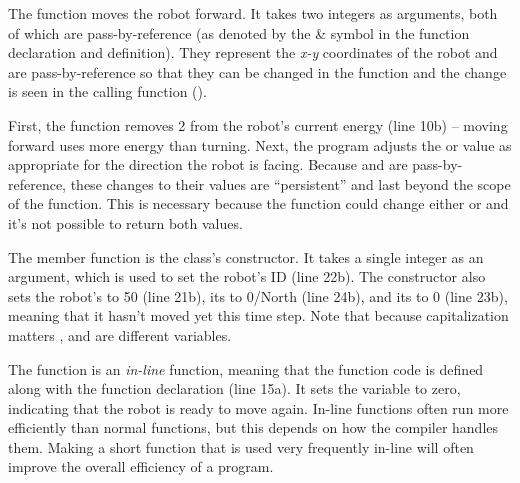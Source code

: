 
The  function moves the robot forward.  It takes two integers as arguments, both of which are pass-by-reference (as denoted by the \& symbol in the function declaration and definition).  They represent the \emph{x-y} coordinates of the robot and are pass-by-reference so that they can be changed in the  function and the change is seen in the calling function ().

First, the function removes 2 from the robot's current energy (line 10b) -- moving forward uses more energy than turning.  Next, the program adjusts the  or  value as appropriate for the direction the robot is facing.  
Because   and  are pass-by-reference, these changes to their values are ``persistent'' and last beyond the scope of the function.  This is necessary because the function could change either  or  and it's not possible to return both values.


The  member function is the class's constructor.  It takes a single integer as an argument, which is used to set the robot's ID (line 22b).  The  constructor also sets the robot's  to 50 (line 21b), its  to 0/North (line 24b), and its  to 0 (line 23b), meaning that it hasn't moved yet this time step.  Note that because capitalization matters , and  are different variables.


The  function is an \emph{in-line} function, meaning that the function code is defined along with the function declaration (line 15a).  It sets the variable  to zero, indicating that the robot is ready to move again.  In-line functions often run more efficiently than normal functions, but this depends on how the compiler handles them.  Making a short function that is used very frequently in-line will often improve the overall efficiency of a program.


